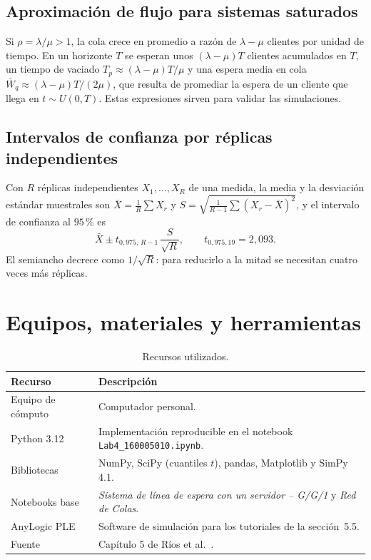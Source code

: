 \documentclass[11pt,a4paper]{article}
\begin{document}
\subsection{Aproximación de flujo para sistemas saturados}
Si $\rho=\lambda/\mu>1$, la cola crece en promedio a razón de $\lambda-\mu$ clientes por
unidad de tiempo. En un horizonte $T$ se esperan unos $(\lambda-\mu)T$ clientes acumulados
en $T$, un tiempo de vaciado $T_p\approx(\lambda-\mu)T/\mu$ y una espera media en cola
$\bar W_q\approx(\lambda-\mu)T/(2\mu)$, que resulta de promediar la espera de un cliente
que llega en $t\sim U(0,T)$. Estas expresiones sirven para validar las simulaciones.

\subsection{Intervalos de confianza por réplicas independientes}
Con $R$ réplicas independientes $X_1,\dots,X_R$ de una medida, la media y la desviación
estándar muestrales son $\bar X=\frac1R\sum X_r$ y
$S=\sqrt{\frac{1}{R-1}\sum(X_r-\bar X)^2}$, y el intervalo de confianza al $95\,\%$ es
\begin{equation}
 \bar X\pm t_{0{,}975,\,R-1}\,\frac{S}{\sqrt R},\qquad t_{0{,}975,19}=2{,}093.
\end{equation}
El semiancho decrece como $1/\sqrt R$: para reducirlo a la mitad se necesitan cuatro
veces más réplicas.

\section{Equipos, materiales y herramientas}
\begin{table}[H]\centering
\caption{Recursos utilizados.}
\begin{tabular}{p{}p{}}\toprule
\textbf{Recurso}&\textbf{Descripción}\\\midrule
Equipo de cómputo&Computador personal.\\
Python 3.12&Implementación reproducible en el notebook \texttt{Lab4\_160005010.ipynb}.\\
Bibliotecas&NumPy, SciPy (cuantiles $t$), pandas, Matplotlib y SimPy 4.1.\\
Notebooks base&\emph{Sistema de línea de espera con un servidor -- G/G/1} y \emph{Red de Colas}.\\
AnyLogic PLE&Software de simulación para los tutoriales de la sección~5.5.\\
Fuente&Capítulo 5 de Ríos et al.\ \cite{rios2008}.\\\bottomrule
\end{tabular}\end{table}
\end{document}
